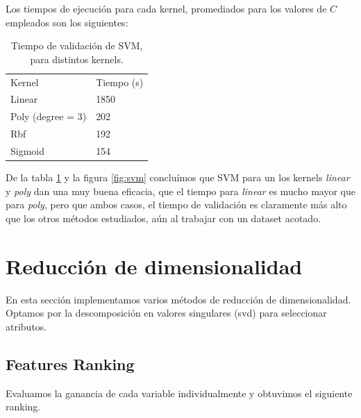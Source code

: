 \documentclass[a4paper,10pt]{article}
\begin{document}
\par Los tiempos de ejecución para cada kernel, promediados para los valores de $C$ empleados son los siguientes:
\begin{table}[H]
\centering
\begin{tabular}{ll}
Kernel & Tiempo (s) \\
Linear & 1850 \\
Poly (degree = 3) & 202 \\
Rbf & 192 \\
Sigmoid & 154 \\
\end{tabular}
\caption{Tiempo de validación de SVM, para distintos kernels.}
\label{table:time_svm}
\end{table}
De la tabla \ref{table:time_svm} y la figura \ref{fig:svm} concluímos que SVM para un los kernels \emph{linear} y \emph{poly} dan una muy buena eficacia, que el tiempo para \emph{linear} es mucho mayor que para \emph{poly}, pero que ambos casos, el tiempo de validación es claramente más alto que los otros métodos estudiados, aún al trabajar con un dataset acotado.


\section{Reducci\'on de dimensionalidad} \label{sec:seleccion}

En esta secci\'on implementamos varios m\'etodos de reducci\'on de dimensionalidad. Optamos por la descomposición en valores singulares (svd) para seleccionar atributos. 

\subsection{Features Ranking}

Evaluamos la ganancia de cada variable individualmente y obtuvimos el siguiente ranking. 
\end{document}
